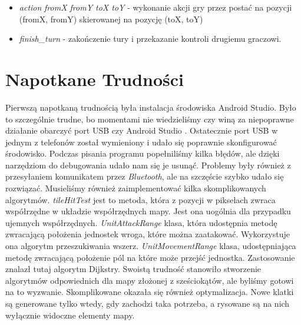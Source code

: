 \documentclass[paper=a4, fontsize=11pt]{scrartcl} %
\numberwithin{equation}{section} %
\numberwithin{figure}{section} %
\numberwithin{table}{section} %
\begin{document}
\begin{itemize}

  \item \emph{action} \textit{fromX fromY toX toY} - wykonanie akcji gry przez
    postać na pozycji (fromX, fromY) skierowanej na pozycję (toX, toY)

  \item \emph{finish\_turn} - zakończenie tury i przekazanie kontroli drugiemu graczowi.

\end{itemize}

\section{Napotkane Trudności}
Pierwszą napotkaną trudnością była instalacja środowiska Android Studio. Było to szczególnie trudne, bo momentami nie wiedzieliśmy czy winą za niepoprawne działanie obarczyć port USB czy Android Studio . Ostatecznie port USB w jednym z telefonów został wymieniony i udało się poprawnie skonfigurować środowisko. Podczas pisania programu popełniliśmy kilka błędów, ale dzięki narzędziom do debugowania udało nam się je usunąć. Problemy były również z przesyłaniem komunikatem przez \textit{Bluetooth}, ale na szczęście szybko udało się rozwiązać. Musieliśmy również zaimplementować kilka skomplikowanych algorytmów. \textit{tileHitTest} jest to metoda, która z pozycji w pikselach zwraca współrzędne w układzie współrzędnych mapy. Jest ona uogólnia dla przypadku ujemnych współrzędnych. \textit{UnitAttackRange} klasa, która udostępnia metodę zwracającą położenia jednostek wroga, które można zaatakować. Wykorzystuje ona algorytm przeszukiwania wszerz.  \textit{UnitMovementRange} klasa, udostępniająca metodę zwracającą położenie pól na które może przejść jednostka. Zastosowanie znalazł tutaj algorytm Dijkstry. Swoistą trudność stanowiło stworzenie algorytmów odpowiednich dla mapy złożonej z sześciokątów, ale byliśmy gotowi na to wyzwanie. Skomplikowane okazała się również optymalizacja. Nowe klatki są generowane tylko wtedy, gdy zachodzi taka potrzeba, a rysowane są na nich wyłącznie widoczne elementy mapy.

\end{document}
